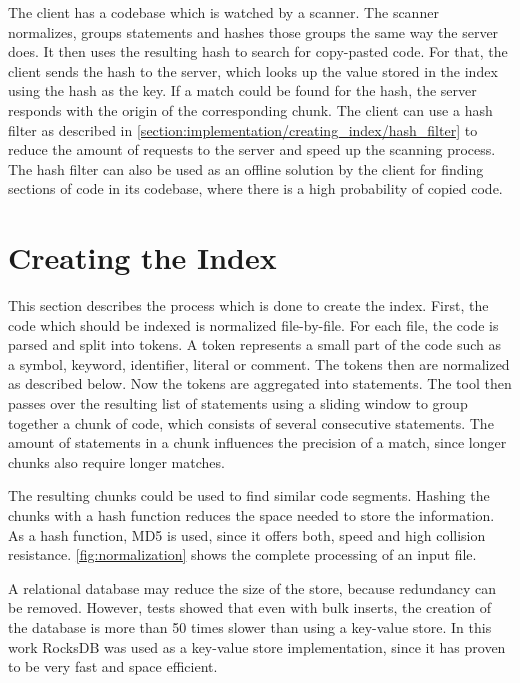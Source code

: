 The client has a codebase which is watched by a scanner.
The scanner normalizes, groups statements and hashes those groups the same way the server does.
It then uses the resulting hash to search for copy-pasted code.
For that, the client sends the hash to the server, which looks up the value stored in the index using the hash as the key.
If a match could be found for the hash, the server responds with the origin of the corresponding chunk.
The client can use a hash filter as described in \autoref{section:implementation/creating_index/hash_filter} to reduce the amount of requests to the server and speed up the scanning process.
The hash filter can also be used as an offline solution by the client for finding sections of code in its codebase, where there is a high probability of copied code.

\section{Creating the Index}\label{section:implementation/creating_index}
This section describes the process which is done to create the index.
First, the code which should be indexed is normalized file-by-file.
For each file, the code is parsed and split into tokens.
A token represents a small part of the code such as a symbol, keyword, identifier, literal or comment.
The tokens then are normalized as described below.
Now the tokens are aggregated into statements.
The tool then passes over the resulting list of statements using a sliding window to group together a chunk of code, which consists of several consecutive statements.
The amount of statements in a chunk influences the precision of a match, since longer chunks also require longer matches.

The resulting chunks could be used to find similar code segments.
Hashing the chunks with a hash function reduces the space needed to store the information.
As a hash function, MD5 is used, since it offers both, speed and high collision resistance.
\autoref{fig:normalization} shows the complete processing of an input file.

A relational database may reduce the size of the store, because redundancy can be removed.
However, tests showed that even with bulk inserts, the creation of the database is more than 50 times slower than using a key-value store.
In this work RocksDB was used as a key-value store implementation, since it has proven to be very fast and space efficient.

